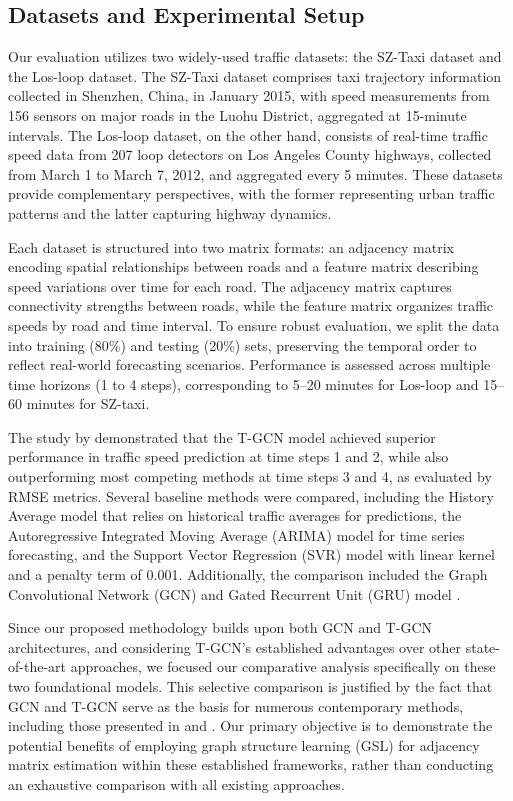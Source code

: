 \documentclass[pdflatex,sn-mathphys-num]{sn-jnl}%
\theoremstyle{thmstyleone}%
\theoremstyle{thmstyletwo}%
\theoremstyle{thmstylethree}%
\begin{document}
\subsection{Datasets and Experimental Setup}

Our evaluation utilizes two widely-used traffic datasets: the SZ-Taxi dataset and the Los-loop dataset. The SZ-Taxi dataset comprises taxi trajectory information collected in Shenzhen, China, in January 2015, with speed measurements from 156 sensors on major roads in the Luohu District, aggregated at 15-minute intervals. The Los-loop dataset, on the other hand, consists of real-time traffic speed data from 207 loop detectors on Los Angeles County highways, collected from March 1 to March 7, 2012, and aggregated every 5 minutes. These datasets provide complementary perspectives, with the former representing urban traffic patterns and the latter capturing highway dynamics.

Each dataset is structured into two matrix formats: an adjacency matrix encoding spatial relationships between roads and a feature matrix describing speed variations over time for each road. The adjacency matrix captures connectivity strengths between roads, while the feature matrix organizes traffic speeds by road and time interval. To ensure robust evaluation, we split the data into training (80\%) and testing (20\%) sets, preserving the temporal order to reflect real-world forecasting scenarios. Performance is assessed across multiple time horizons (1 to 4 steps), corresponding to 5–20 minutes for Los-loop and 15–60 minutes for SZ-taxi.


The study by \cite{zhao2019t} demonstrated that the T-GCN model achieved superior performance in traffic speed prediction at time steps 1 and 2, while also outperforming most competing methods at time steps 3 and 4, as evaluated by RMSE metrics. Several baseline methods were compared, including the History Average model \citep{Liu2004A} that relies on historical traffic averages for predictions, the Autoregressive Integrated Moving Average (ARIMA) model \citep{ahmed1979analysis} for time series forecasting, and the Support Vector Regression (SVR) model \citep{Smola2004A} with linear kernel and a penalty term of 0.001. Additionally, the comparison included the Graph Convolutional Network (GCN) \citep{kipf2017semi} and Gated Recurrent Unit (GRU) model \citep{Cho2014On}.

Since our proposed methodology builds upon both GCN and T-GCN architectures, and considering T-GCN's established advantages over other state-of-the-art approaches, we focused our comparative analysis specifically on these two foundational models. This selective comparison is justified by the fact that GCN and T-GCN serve as the basis for numerous contemporary methods, including those presented in \cite{YU2020189} and \cite{ZHOU2025110304}. Our primary objective is to demonstrate the potential benefits of employing graph structure learning (GSL) for adjacency matrix estimation within these established frameworks, rather than conducting an exhaustive comparison with all existing approaches.
\end{document}
